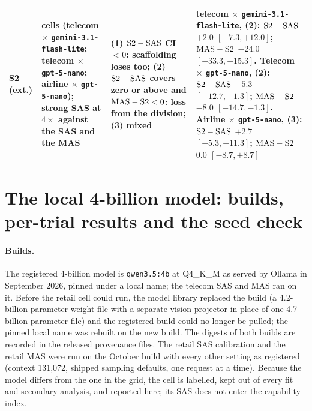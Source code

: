 \begin{table}[H]
\begin{center}
\begin{tabular}{@{}>{\raggedright\arraybackslash}p{1.9cm}>{\raggedright\arraybackslash}p{4.4cm}>{\raggedright\arraybackslash}p{4.2cm}>{\raggedright\arraybackslash}p{5.3cm}@{}}
S2 (ext.) & 3 cells (telecom $\times$ \texttt{gemini-3.1-flash-lite}; telecom $\times$ \texttt{gpt-5-nano}; airline $\times$ \texttt{gpt-5-nano}); strong SAS at $4\times$ against the SAS and the MAS & (1) $\text{S2}-\text{\textup{SAS}}$ CI $<0$: scaffolding loses too; (2) $\text{S2}-\text{\textup{SAS}}$ covers zero or above and $\text{\textup{MAS}}-\text{S2}<0$: loss from the division; (3) mixed & telecom $\times$ \texttt{gemini-3.1-flash-lite}, (2): $\text{S2}-\text{\textup{SAS}}$ $+2.0$ $[-7.3, +12.0]$; $\text{\textup{MAS}}-\text{S2}$ $-24.0$ $[-33.3, -15.3]$. Telecom $\times$ \texttt{gpt-5-nano}, (2): $\text{S2}-\text{\textup{SAS}}$ $-5.3$ $[-12.7, +1.3]$; $\text{\textup{MAS}}-\text{S2}$ $-8.0$ $[-14.7, -1.3]$. Airline $\times$ \texttt{gpt-5-nano}, (3): $\text{S2}-\text{\textup{SAS}}$ $+2.7$ $[-5.3, +11.3]$; $\text{\textup{MAS}}-\text{S2}$ $0.0$ $[-8.7, +8.7]$ \\
\bottomrule
\end{tabular}
\end{center}
\end{table}

\section{The local 4-billion model: builds, per-trial results and the seed check}
\label{app:local4b}

\paragraph{Builds.} The registered 4-billion model is \texttt{qwen3.5:4b} at Q4\_K\_M as served by Ollama in September 2026, pinned under a local name; the telecom SAS and MAS ran on it. Before the retail cell could run, the model library replaced the build (a 4.2-billion-parameter weight file with a separate vision projector in place of one 4.7-billion-parameter file) and the registered build could no longer be pulled; the pinned local name was rebuilt on the new build. The digests of both builds are recorded in the released provenance files. The retail SAS calibration and the retail MAS were run on the October build with every other setting as registered (context 131,072, shipped sampling defaults, one request at a time). Because the model differs from the one in the grid, the cell is labelled, kept out of every fit and secondary analysis, and reported here; its SAS does not enter the capability index.

